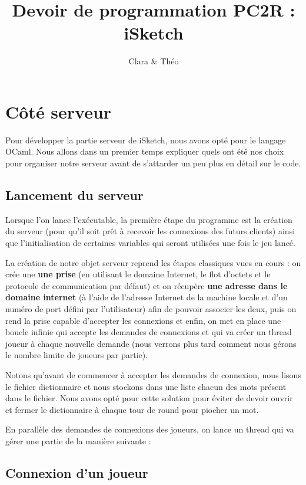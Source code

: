 \documentclass[a4paper, 11pt]{article}
\title{Devoir de programmation PC2R : iSketch}
\author{Clara \bsc{Muller} \& Théo \bsc{Lebourg}}
\date{}
\begin{document}
\maketitle

\section{Côté serveur}
Pour développer la partie serveur de iSketch, nous avons opté pour le
langage OCaml. Nous allons dans un premier temps expliquer quels ont
été nos choix pour organiser notre serveur avant de s’attarder un peu
plus en détail sur le code.

\subsection {Lancement du serveur}
Lorsque l'on lance l’exécutable, la première étape du programme est la
création du serveur (pour qu’il soit prêt à recevoir les connexions
des futurs clients) ainsi que l’initialisation de certaines variables
qui seront utilisées une fois le jeu lancé.

\bigskip La création de notre objet serveur reprend les étapes
classiques vues en cours : on crée une \textbf{une prise} (en
utilisant le domaine Internet, le flot d’octets et le protocole de
communication par défaut) et on récupère \textbf{une adresse dans le
  domaine internet} (à l’aide de l’adresse Internet de la machine
locale et d’un numéro de port défini par l’utilisateur) afin de
pouvoir associer les deux, puis on rend la prise capable d’accepter
les connexions et enfin, on met en place une boucle infinie qui
accepte les demandes de connexions et qui va créer un thread joueur à
chaque nouvelle demande (nous verrons plus tard comment nous gérons le
nombre limite de joueurs par partie).

Notons qu’avant de commencer à accepter les demandes de connexion,
nous lisons le fichier dictionnaire et nous stockons dans une liste
chacun des mots présent dans le fichier. Nous avons opté pour cette
solution pour éviter de devoir ouvrir et fermer le dictionnaire à
chaque tour de round pour piocher un mot. 

\bigskip En parallèle des demandes de connexions des joueurs, on lance
un thread qui va gérer une partie de la manière suivante :
\bigskip

\subsection {Connexion d’un joueur}
\end{document}
